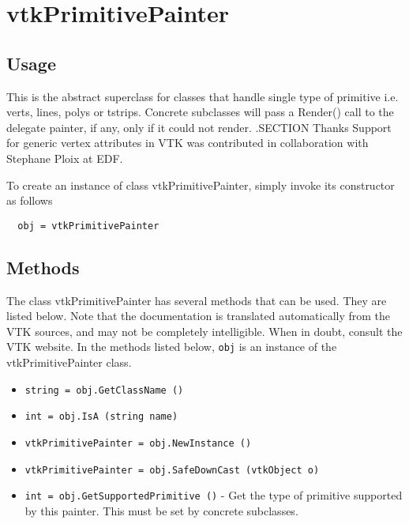 \section{vtkPrimitivePainter}

\subsection{Usage}

 This is the abstract superclass for classes that handle single type
 of primitive i.e. verts, lines, polys or tstrips. 
 Concrete subclasses will pass a Render() call to the delegate painter,
 if any, only if it could not render.
 .SECTION Thanks
 Support for generic vertex attributes in VTK was contributed in
 collaboration with Stephane Ploix at EDF.

To create an instance of class vtkPrimitivePainter, simply
invoke its constructor as follows
\begin{verbatim}
  obj = vtkPrimitivePainter
\end{verbatim}
\subsection{Methods}

The class vtkPrimitivePainter has several methods that can be used.
  They are listed below.
Note that the documentation is translated automatically from the VTK sources,
and may not be completely intelligible.  When in doubt, consult the VTK website.
In the methods listed below, \verb|obj| is an instance of the vtkPrimitivePainter class.
\begin{itemize}
\item  \verb|string = obj.GetClassName ()|

\item  \verb|int = obj.IsA (string name)|

\item  \verb|vtkPrimitivePainter = obj.NewInstance ()|

\item  \verb|vtkPrimitivePainter = obj.SafeDownCast (vtkObject o)|

\item  \verb|int = obj.GetSupportedPrimitive ()| -  Get the type of primitive supported by this painter.
 This must be set by concrete subclasses.

\end{itemize}
